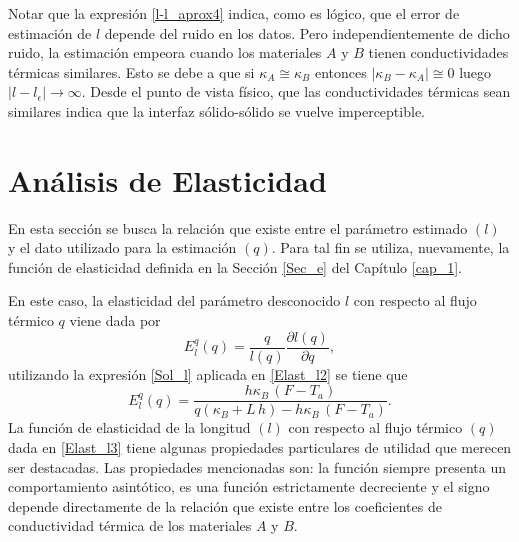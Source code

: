 %
\begin{rem}
\label{rem7_3}
Notar que la expresi\'on \eqref{l-l_aprox4} indica, como es l\'ogico, que el error de estimaci\'on de $l$ depende del ruido en los datos. Pero independientemente de dicho ruido, la estimaci\'on empeora cuando los materiales $A$ y $B$ tienen conductividades t\'ermicas similares.
Esto se debe a que si $\kappa_A \cong \kappa_B$ entonces $|\kappa_B-\kappa_A|\cong 0$ luego $|l-l_\epsilon|\longrightarrow \infty$. Desde el punto de vista f\'isico, que las conductividades t\'ermicas sean similares indica que la interfaz s\'olido-s\'olido se vuelve imperceptible.
\end{rem}
%
\section{An\'alisis de Elasticidad} \label{sec:Ana_Elastcidad}
%
En esta secci\'on se busca la relaci\'on que existe entre el par\'ametro estimado $(l)$ y el dato utilizado para la estimaci\'on $(q)$. Para tal fin se utiliza, nuevamente, la funci\'on de  elasticidad \cite{Syd05} definida en la Secci\'on \ref{Sec_e} del Cap\'itulo \ref{cap_1}.

En este caso, la elasticidad del par\'ametro desconocido $l$ con respecto al flujo t\'ermico $q$ viene dada por
%
\begin{equation}
\label{Elast_l2}
E_{l}^{q}(q)= \dfrac{q}{l(q)}\dfrac{\partial l(q)}{\partial q},    
\end{equation}
%
utilizando la expresi\'on \eqref{Sol_l} aplicada en \eqref{Elast_l2} se tiene que 
%
\begin{equation}
\label{Elast_l3}
E_{l}^{q}(q)= \dfrac{h \kappa_B \,(F-T_a)}{q(\kappa_B+L \, h)-h \kappa_B \,(F-T_a)}.
\end{equation}
%  
La funci\'on de elasticidad de la longitud $(l)$ con respecto al flujo t\'ermico $(q)$ dada en \eqref{Elast_l3} tiene algunas propiedades particulares de utilidad que merecen ser destacadas. 
Las propiedades mencionadas son: la funci\'on siempre presenta un comportamiento asint\'otico, es una funci\'on estrictamente decreciente y el signo depende directamente de la relaci\'on que existe entre los coeficientes de conductividad t\'ermica de los materiales $A$ y $B$.
   
